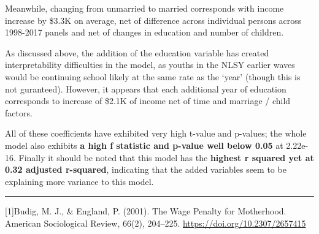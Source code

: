 \documentclass[
]{article}
\begin{document}
Meanwhile, changing from unmarried to married corresponds with income
increase by \$3.3K on average, net of difference across individual
persons across 1998-2017 panels and net of changes in education and
number of children.

As discussed above, the addition of the education variable has created
interpretability difficulties in the model, as youths in the NLSY
earlier waves would be continuing school likely at the same rate as the
`year' (though this is not guranteed). However, it appears that each
additional year of education corresponds to increase of \$2.1K of income
net of time and marriage / child factors.

All of these coefficients have exhibited very high t-value and p-values;
the whole model also exhibits \textbf{a high f statistic and p-value
well below 0.05} at 2.22e-16. Finally it should be noted that this model
has the \textbf{highest r squared yet at 0.32 adjusted r-squared},
indicating that the added variables seem to be explaining more variance
to this model.

\begin{center}\rule{0.5\linewidth}{0.5pt}\end{center}

{[}1{]}Budig, M. J., \& England, P. (2001). The Wage Penalty for
Motherhood. American Sociological Review, 66(2), 204--225.
\url{https://doi.org/10.2307/2657415}
\end{document}
